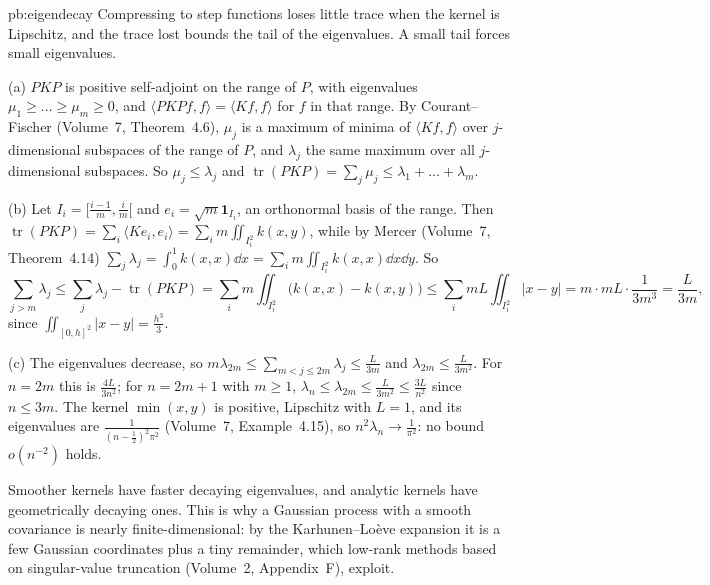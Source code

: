 \begin{solution}{pb:eigendecay}
\idea Compressing to step functions loses little trace when the kernel is Lipschitz, and the trace lost bounds the tail of the eigenvalues. A small tail forces small eigenvalues.

\writeup (a) $PKP$ is positive self-adjoint on the range of $P$, with eigenvalues $\mu_1\ge\dots\ge\mu_m\ge0$, and $\langle PKPf,f\rangle=\langle Kf,f\rangle$ for $f$ in that range. By Courant--Fischer
(Volume~7, Theorem~4.6), $\mu_j$ is a maximum of minima of $\langle Kf,f\rangle$ over $j$-dimensional subspaces of the range of $P$, and $\lambda_j$ the same maximum over all $j$-dimensional
subspaces. So $\mu_j\le\lambda_j$ and $\operatorname{tr}(PKP)=\sum_j\mu_j\le\lambda_1+\dots+\lambda_m$.

(b) Let $I_i=[\frac{i-1}m,\frac im[$ and $e_i=\sqrt m\mathbf 1_{I_i}$, an orthonormal basis of the range. Then $\operatorname{tr}(PKP)=\sum_i\langle Ke_i,e_i\rangle=\sum_im\iint_{I_i^2}k(x,y)$, while by Mercer (Volume~7,
Theorem~4.14) $\sum_j\lambda_j=\int_0^1k(x,x)\dd x=\sum_im\iint_{I_i^2}k(x,x)\dd x\dd y$. So
\[
\sum_{j>m}\lambda_j\le\sum_j\lambda_j-\operatorname{tr}(PKP)=\sum_im\iint_{I_i^2}\bigl(k(x,x)-k(x,y)\bigr)\le\sum_imL\iint_{I_i^2}|x-y|=m\cdot mL\cdot\frac1{3m^3}=\frac L{3m},
\]
since $\iint_{[0,h]^2}|x-y|=\frac{h^3}3$.

(c) The eigenvalues decrease, so $m\lambda_{2m}\le\sum_{m<j\le2m}\lambda_j\le\frac L{3m}$ and $\lambda_{2m}\le\frac L{3m^2}$. For $n=2m$ this is $\frac{4L}{3n^2}$; for $n=2m+1$ with $m\ge1$,
$\lambda_n\le\lambda_{2m}\le\frac L{3m^2}\le\frac{3L}{n^2}$ since $n\le3m$. The kernel $\min(x,y)$ is positive, Lipschitz with $L=1$, and its eigenvalues are $\frac1{(n-\frac12)^2\pi^2}$ (Volume~7,
Example~4.15), so $n^2\lambda_n\to\frac1{\pi^2}$: no bound $o(n^{-2})$ holds.

\leads Smoother kernels have faster decaying eigenvalues, and analytic kernels have geometrically decaying ones. This is why a Gaussian process with a smooth covariance is nearly
finite-dimensional: by the Karhunen--Loève expansion it is a few Gaussian coordinates plus a tiny remainder, which low-rank methods based on singular-value truncation (Volume~2, Appendix~F), exploit.
\end{solution}

